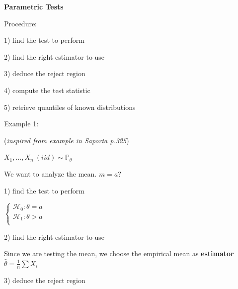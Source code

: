 {\fontsize{12pt}{22pt} \textbf{Parametric Tests}\par}

\vspace{5mm}

Procedure:

1) find the test to perform

2) find the right estimator to use

3) deduce the reject region

4) compute the test statistic

5) retrieve quantiles of known distributions

\vspace{5mm}

Example 1: 

\vspace{5mm}

(\textit{inspired from example in Saporta p.325})

\vspace{5mm}

$X_1,...,X_n~(iid)\sim \mathbb{P_\theta}$

\vspace{5mm}

We want to analyze the mean. $m=a$?

\vspace{5mm}

1) find the test to perform

\vspace{5mm}

$
\left\{
    \begin{array}{ll}
        \mathcal{H}_0: \theta=a \\
        \mathcal{H}_1: \theta>a \\
    \end{array}
\right.
$

\vspace{5mm}

2) find the right estimator to use

\vspace{5mm}

Since we are testing the mean, we choose the empirical mean as \textbf{estimator} $\widehat{\theta}=\frac{1}{n}\sum{X_i}$

\vspace{5mm}

3) deduce the reject region

\vspace{5mm}

